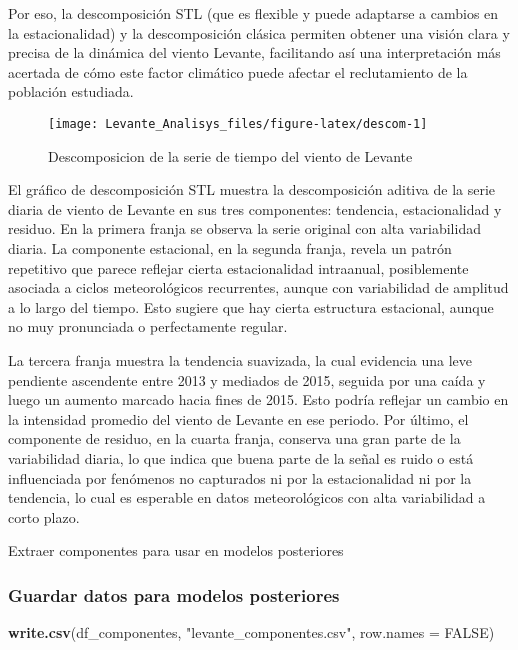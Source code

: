 \documentclass[
]{article}
\newenvironment{Shaded}{\begin{snugshade}}{\end{snugshade}}
\newcommand{\AttributeTok}[1]{\textcolor[rgb]{0.13,0.29,0.53}{#1}}
\newcommand{\ConstantTok}[1]{\textcolor[rgb]{0.56,0.35,0.01}{#1}}
\newcommand{\FunctionTok}[1]{\textcolor[rgb]{0.13,0.29,0.53}{\textbf{#1}}}
\newcommand{\NormalTok}[1]{#1}
\newcommand{\StringTok}[1]{\textcolor[rgb]{0.31,0.60,0.02}{#1}}
\begin{document}
Por eso, la descomposición STL (que es flexible y puede adaptarse a cambios en la estacionalidad) y la descomposición clásica permiten obtener una visión clara y precisa de la dinámica del viento Levante, facilitando así una interpretación más acertada de cómo este factor climático puede afectar el reclutamiento de la población estudiada.

\begin{figure}

{\centering \texttt{[image: Levante\_Analisys\_files/figure-latex/descom-1]} 

}

\caption{Descomposicion de la serie de tiempo del viento de Levante}\label{fig:descom}
\end{figure}

El gráfico de descomposición STL muestra la descomposición aditiva de la serie diaria de viento de Levante en sus tres componentes: tendencia, estacionalidad y residuo. En la primera franja se observa la serie original con alta variabilidad diaria. La componente estacional, en la segunda franja, revela un patrón repetitivo que parece reflejar cierta estacionalidad intraanual, posiblemente asociada a ciclos meteorológicos recurrentes, aunque con variabilidad de amplitud a lo largo del tiempo. Esto sugiere que hay cierta estructura estacional, aunque no muy pronunciada o perfectamente regular.

La tercera franja muestra la tendencia suavizada, la cual evidencia una leve pendiente ascendente entre 2013 y mediados de 2015, seguida por una caída y luego un aumento marcado hacia fines de 2015. Esto podría reflejar un cambio en la intensidad promedio del viento de Levante en ese periodo. Por último, el componente de residuo, en la cuarta franja, conserva una gran parte de la variabilidad diaria, lo que indica que buena parte de la señal es ruido o está influenciada por fenómenos no capturados ni por la estacionalidad ni por la tendencia, lo cual es esperable en datos meteorológicos con alta variabilidad a corto plazo.

Extraer componentes para usar en modelos posteriores

\subsubsection{Guardar datos para modelos posteriores}\label{guardar-datos-para-modelos-posteriores}

\begin{Shaded}
\begin{Highlighting}[]
\FunctionTok{write.csv}\NormalTok{(df\_componentes, }
          \StringTok{"levante\_componentes.csv"}\NormalTok{, }\AttributeTok{row.names =} \ConstantTok{FALSE}\NormalTok{)}
\end{Highlighting}
\end{Shaded}
\end{document}
